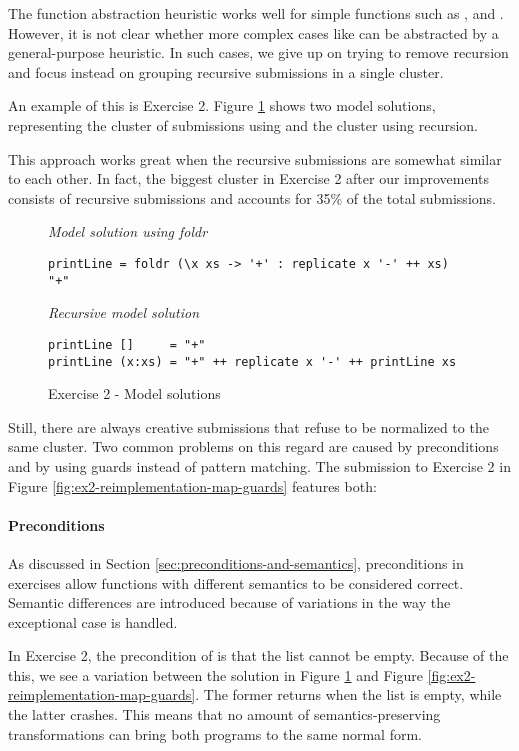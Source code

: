 The function abstraction heuristic works well for simple functions such as ,  and . However, it is not clear whether more complex cases like  can be abstracted by a general-purpose heuristic. In such cases, we give up on trying to remove recursion and focus instead on grouping recursive submissions in a single cluster.

An example of this is Exercise 2. Figure \ref{fig:ex2-model-solutions} shows two model solutions, representing the cluster of submissions using  and the cluster using recursion.

This approach works great when the recursive submissions are somewhat similar to each other. In fact, the biggest cluster in Exercise 2 after our improvements consists of recursive submissions and accounts for 35\% of the total submissions.

\begin{figure}
\centering
\emph{Model solution using foldr}
\begin{verbatim}
printLine = foldr (\x xs -> '+' : replicate x '-' ++ xs) "+"
\end{verbatim}
\bigskip
\emph{Recursive model solution}
\begin{verbatim}
printLine []     = "+"
printLine (x:xs) = "+" ++ replicate x '-' ++ printLine xs
\end{verbatim}
\caption{Exercise 2 - Model solutions}
\label{fig:ex2-model-solutions}
\end{figure}

Still, there are always creative submissions that refuse to be normalized to the same cluster. Two common problems on this regard are caused by preconditions and by using guards instead of pattern matching. The submission to Exercise 2 in Figure \ref{fig:ex2-reimplementation-map-guards} features both:

\paragraph{Preconditions}

As discussed in Section \ref{sec:preconditions-and-semantics}, preconditions in exercises allow functions with different semantics to be considered correct. Semantic differences are introduced because of variations in the way the exceptional case is handled.

In Exercise 2, the precondition of  is that the list cannot be empty. Because of the this, we see a variation between the solution in Figure \ref{fig:ex2-model-solutions} and Figure \ref{fig:ex2-reimplementation-map-guards}. The former returns  when the list is empty, while the latter crashes. This means that no amount of semantics-preserving transformations can bring both programs to the same normal form.

